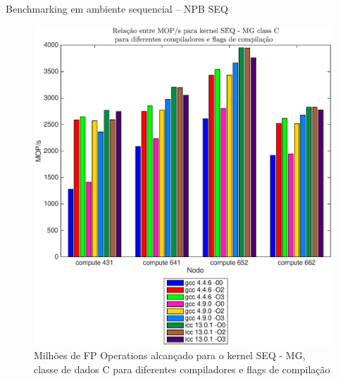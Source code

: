 \documentclass{beamer}
\begin{document}
\begin{frame}{Benchmarking em ambiente sequencial -- NPB SEQ}
\begin{figure}[H]
\centering
\includegraphics[width=1.1\columnwidth]{EPS/SEQ/MOPS_seq_mg_C.eps}
\caption{Milhões de FP Operations alcançado para o kernel SEQ - MG, classe de dados C para diferentes compiladores e flags de compilação}
\label{mops_seq_mg_c}
\end{figure}


  \end{frame}
  
  
\end{document}
